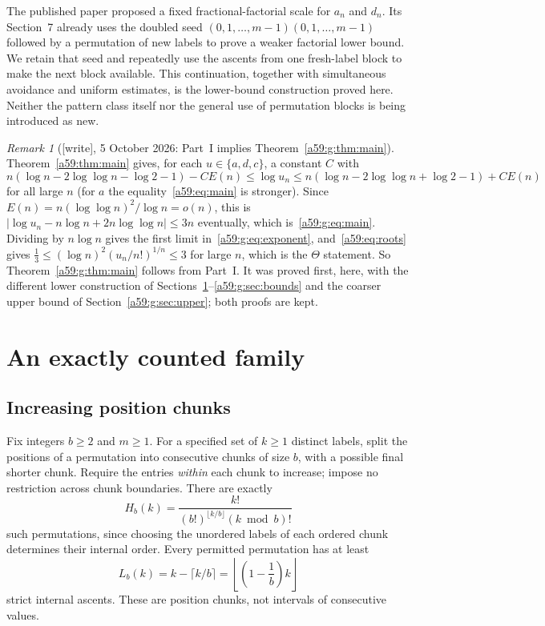 \documentclass[11pt,letterpaper]{article}
\theoremstyle{remark}\newtheorem{remark}[theorem]{Remark}
\newcommand{\wtag}{\textup{[write]}}
\theoremstyle{remark}\newtheorem{wremark}{Remark}\renewcommand{\thewremark}{W\arabic{wremark}}
\theoremstyle{plain}\newtheorem{wcorollary}[wremark]{Corollary}
\begin{document}
The published paper \cite[\S\S6--7]{conway} proposed a fixed fractional-factorial scale for $a_n$ and $d_n$. Its Section~7 already uses the doubled seed
$(0,1,\ldots,m-1)(0,1,\ldots,m-1)$ followed by a permutation of new labels to prove a weaker factorial lower bound. We retain that seed and repeatedly use the ascents from one fresh-label block to make the next block available. This continuation, together with simultaneous avoidance and uniform estimates, is the lower-bound construction proved here. Neither the pattern class itself nor the general use of permutation blocks is being introduced as new.

\begin{wremark}[\wtag, 5 October 2026: Part~I implies Theorem~\ref{a59:g:thm:main}]\label{a59:g:rem:implied}
Theorem~\ref{a59:thm:main} gives, for each $u\in\{a,d,c\}$, a constant $C$
with
\[
 n(\log n-2\log\log n-\log2-1)-CE(n)\le\log u_n
 \le n(\log n-2\log\log n+\log2-1)+CE(n)
\]
for all large $n$ (for $a$ the equality~\eqref{a59:eq:main} is stronger).
Since $E(n)=n(\log\log n)^2/\log n=o(n)$, this is
$|\log u_n-n\log n+2n\log\log n|\le3n$ eventually, which
is~\eqref{a59:g:eq:main}. Dividing by $n\log n$ gives the first limit
in~\eqref{a59:g:eq:exponent}, and~\eqref{a59:eq:roots} gives
$\frac13\le(\log n)^2(u_n/n!)^{1/n}\le3$ for large $n$, which is the
$\Theta$ statement. So Theorem~\ref{a59:g:thm:main} follows from Part~I. It
was proved first, here, with the different lower construction of
Sections~\ref{a59:g:sec:construction}--\ref{a59:g:sec:bounds} and the coarser
upper bound of Section~\ref{a59:g:sec:upper}; both proofs are kept.
\end{wremark}
\section{An exactly counted family}\label{a59:g:sec:construction}
\subsection{Increasing position chunks}
Fix integers $b\geq2$ and $m\geq1$. For a specified set of $k\geq1$ distinct labels, split the positions of a permutation into consecutive chunks of size $b$, with a possible final shorter chunk. Require the entries \emph{within} each chunk to increase; impose no restriction across chunk boundaries. There are exactly
\begin{equation}\label{a59:g:eq:H}
 H_b(k)=\frac{k!}{(b!)^{\lfloor k/b\rfloor}(k\bmod b)!}
\end{equation}
such permutations, since choosing the unordered labels of each ordered chunk determines their internal order. Every permitted permutation has at least
\begin{equation}\label{a59:g:eq:krec}
 L_b(k)=k-\lceil k/b\rceil
       =\left\lfloor\left(1-\frac1b\right)k\right\rfloor
\end{equation}
strict internal ascents. These are position chunks, not intervals of consecutive values.
\end{document}
